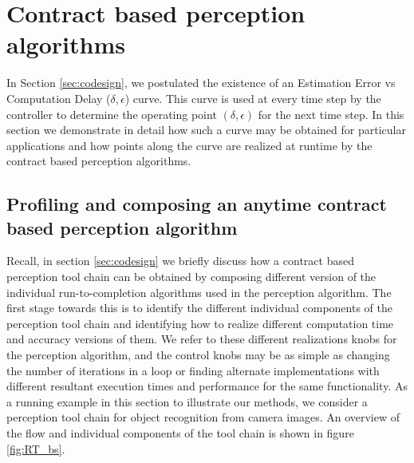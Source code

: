 \section{Contract based perception algorithms}
\label{delayErrorCurve}

In Section \ref{sec:codesign}, we postulated the existence of an Estimation Error vs Computation Delay ($\delta,\epsilon$) curve. %
This curve is used at every time step by the controller to determine the operating point $(\delta,\epsilon)$ for the next time step.
In this section we demonstrate in detail how such a curve may be obtained for particular applications and how points along the curve are realized at runtime by the contract based perception algorithms.

\subsection{Profiling and composing an anytime contract based perception algorithm}

Recall, in section \ref{sec:codesign} we briefly discuss how a contract based perception tool chain can be obtained by composing different version of the individual run-to-completion algorithms used in the perception algorithm. The first stage towards this is to identify the different individual components of the perception tool chain and identifying how to realize different computation time and accuracy versions of them. We refer to these different realizations  knobs for the perception algorithm, and the control knobs may be as simple as changing the number of iterations in a loop \cite{loop-perf} or finding alternate implementations with different resultant execution times and performance for the same functionality. As a running example in this section to illustrate our methods, we consider a perception tool chain for object recognition from camera images. An overview of the flow and individual components of the tool chain is shown in figure \ref{fig:RT_bs}.

